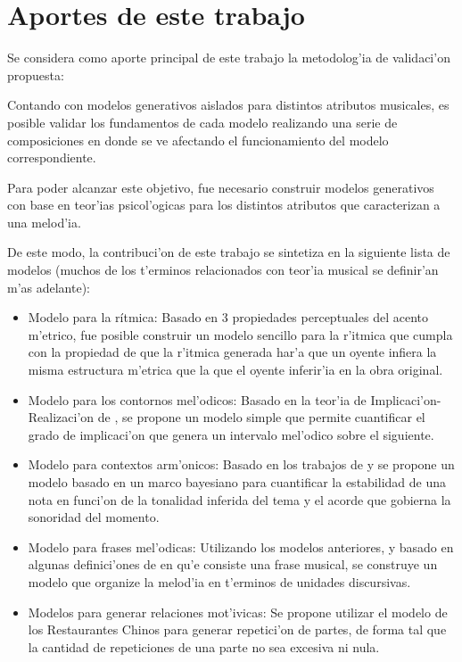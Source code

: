 \section{Aportes de este trabajo}
Se considera como aporte principal de este trabajo la metodolog'ia de validaci'on propuesta: 

Contando con modelos generativos aislados para distintos atributos musicales, es posible validar los fundamentos de cada modelo
realizando una serie de composiciones en donde se ve afectando el funcionamiento del modelo correspondiente.

Para poder alcanzar este objetivo, fue necesario construir modelos ge\-nerativos con base en teor'ias psicol'ogicas para los distintos atributos que 
caracterizan a una melod'ia. 

De este modo, la contribuci'on de este trabajo se sintetiza en la siguiente lista de modelos (muchos de los t'erminos relacionados con teor'ia musical se definir'an
m'as adelante):

\begin{itemize}
 \item Modelo para la r\'itmica: Basado en 3 propiedades perceptuales del acento m'etrico, fue posible construir un modelo sencillo para la r'itmica
 que cumpla con la propiedad de que la r'itmica generada har'a que un oyente infiera la misma estructura m'etrica que la que el 
 oyente inferir'ia en la obra original.

 \item Modelo para los contornos mel'odicos: Basado en la teor'ia de Implicaci'on-Realizaci'on de \cite{Narmour90}, se propone un modelo simple que permite cuantificar 
 el grado de implicaci'on que genera un intervalo mel'odico sobre el siguiente.

 \item Modelo para contextos arm'onicos: Basado en los trabajos de \cite{Krumhansl90} y \cite{Lerdahl2001} se propone un modelo basado en un marco bayesiano
 para cuantificar la estabilidad de una nota en funci'on de la tonalidad inferida del tema y el acorde que gobierna la sonoridad del momento.

 \item Modelo para frases mel'odicas: Utilizando los modelos anteriores, y basado en algunas definici'ones de en qu'e consiste una 
 frase musical, se construye un modelo que organize la melod'ia en t'erminos de unidades discursivas.

 \item Modelos para generar relaciones mot'ivicas: Se propone utilizar el modelo de los Restaurantes Chinos \citep{Teh2007} para generar repetici'on 
 de partes, de forma tal que la cantidad de repeticiones de una parte no sea excesiva ni nula.

\end{itemize}


